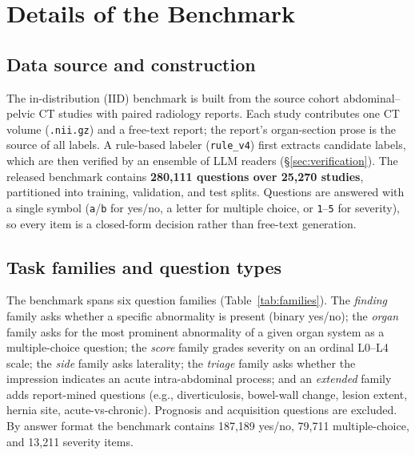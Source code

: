 \section{Details of the Benchmark}
\label{sec:benchmark-details}

\subsection{Data source and construction}
The in-distribution (IID) benchmark is built from the source cohort abdominal--pelvic CT
studies with paired radiology reports. Each study contributes one CT volume
(\texttt{.nii.gz}) and a free-text report; the report's organ-section prose is the
source of all labels. A rule-based labeler (\texttt{rule\_v4}) first extracts
candidate labels, which are then verified by an ensemble of LLM readers
(\S\ref{sec:verification}). The released benchmark contains
\textbf{280{,}111 questions over 25{,}270 studies}, partitioned into training,
validation, and test splits. Questions are answered with a single symbol
(\texttt{a}/\texttt{b} for yes/no, a letter for multiple choice, or \texttt{1}--\texttt{5}
for severity), so every item is a closed-form decision rather than free-text
generation.

\subsection{Task families and question types}
The benchmark spans six question families (Table~\ref{tab:families}). The
\emph{finding} family asks whether a specific abnormality is present (binary
yes/no); the \emph{organ} family asks for the most prominent abnormality of a given
organ system as a multiple-choice question; the \emph{score} family grades severity
on an ordinal L0--L4 scale; the \emph{side} family asks laterality; the
\emph{triage} family asks whether the impression indicates an acute intra-abdominal
process; and an \emph{extended} family adds report-mined questions (e.g.,
diverticulosis, bowel-wall change, lesion extent, hernia site, acute-vs-chronic).
Prognosis and acquisition questions are excluded. By answer format the benchmark
contains 187{,}189 yes/no, 79{,}711 multiple-choice, and 13{,}211 severity items.

